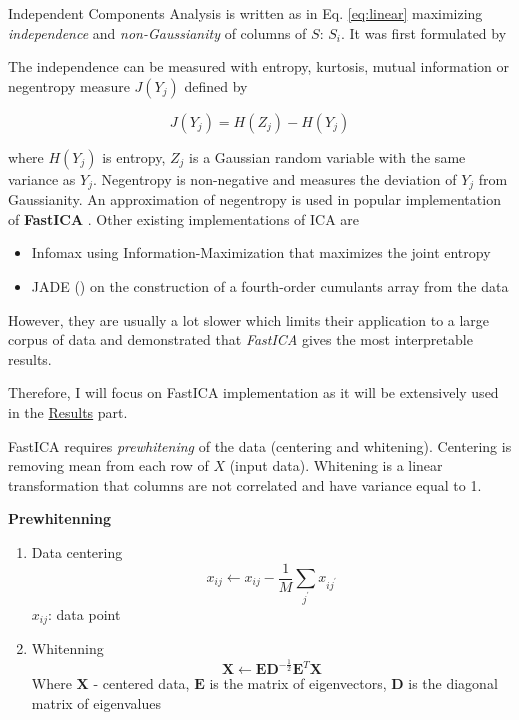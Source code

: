 \documentclass[12pt,]{book}
\providecommand{\tightlist}{%
  \setlength{\itemsep}{0pt}\setlength{\parskip}{0pt}}
\theoremstyle{definition}
\theoremstyle{definition}
\theoremstyle{definition}
\theoremstyle{remark}
\begin{document}
Independent Components Analysis is written as in Eq. \eqref{eq:linear}
maximizing \emph{independence} and \emph{non-Gaussianity} of columns of
\(S\): \(S_i\). It was first formulated by \citet{Herault1986}

The independence can be measured with entropy, kurtosis, mutual
information or negentropy measure \(J(Y_j )\) \citep{Hyvarinen2000}
defined by

\begin{equation}
J(Y_j ) = H(Z_j ) - H(Y_j ) \label{eq:negentropy}
\end{equation}

where \(H(Y_j )\) is entropy, \(Z_j\) is a Gaussian random variable with
the same variance as \(Y_j\). Negentropy is non-negative and measures
the deviation of \(Y_j\) from Gaussianity. An approximation of
negentropy is used in popular implementation of \textbf{FastICA}
\citep{Hyvarinen2000}. Other existing implementations of ICA are

\begin{itemize}
\tightlist
\item
  Infomax \citep{Bell1995} using Information-Maximization that maximizes
  the joint entropy
\item
  JADE (\citet{Cardoso1993}) on the construction of a fourth-order
  cumulants array from the data
\end{itemize}

However, they are usually a lot slower which limits their application to
a large corpus of data and \citet{Teschendorff2007} demonstrated that
\emph{FastICA} gives the most interpretable results.

Therefore, I will focus on FastICA implementation as it will be
extensively used in the \protect\hyperlink{results}{Results} part.

FastICA requires \emph{prewhitening} of the data (centering and
whitening). Centering is removing mean from each row of \(X\) (input
data). Whitening is a linear transformation that columns are not
correlated and have variance equal to 1.

\textbf{Prewhitenning }

\begin{enumerate}
\def\labelenumi{\arabic{enumi}.}
\tightlist
\item
  Data centering \begin{equation}
    x_{ij} \leftarrow x_{ij} - {\frac {1}{M}}\sum_{j^{\prime }}x_{ij^{\prime }}  \label{eq:cent}
    \end{equation} \(x_{ij}\): data point
\item
  Whitenning \begin{equation}
   \mathbf {X} \leftarrow \mathbf {E}\mathbf {D} ^{-\frac{1}{2}}\mathbf {E} ^{T}\mathbf {X} \label{eq:whit}
   \end{equation} Where \(\mathbf {X}\) - centered data, \(\mathbf {E}\)
  is the matrix of eigenvectors, \(\mathbf{D}\) is the diagonal matrix
  of eigenvalues
\end{enumerate}
\end{document}
